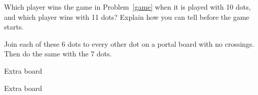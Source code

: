 \documentclass[12pt]{article}
\begin{document}
\vspace{10pt}
\noindent\begin{minipage}[t]{9.6cm}\vspace{0pt}
\answerbox{9.6cm}{9.2cm}
\end{minipage}\hfill
\begin{minipage}[t]{7.6cm}\vspace{0pt}
\end{minipage}

\vspace{6pt}
\problem Which player wins the game in Problem~\ref{game} when it is played with 10 dots, and which player wins with 11 dots? Explain how you can tell before the game starts.

\vspace{10pt}
\noindent\begin{minipage}[t]{7.4cm}\vspace{0pt}
\answerbox{7.4cm}{7.0cm}
\end{minipage}\hfill
\begin{minipage}[t]{9.8cm}\vspace{0pt}
\end{minipage}

\newpage
\problem Join each of these 6 dots to every other dot on a portal board with no crossings. Then do the same with the 7 dots.

\vspace{16pt}
\noindent\begin{minipage}[t]{8.6cm}\centering

\end{minipage}\hfill
\begin{minipage}[t]{8.6cm}\centering

\end{minipage}

\vspace{40pt}
\noindent\begin{minipage}[t]{8.6cm}\centering
\par\vspace{4pt}
{\small Extra board}
\end{minipage}\hfill
\begin{minipage}[t]{8.6cm}\centering
\par\vspace{4pt}
{\small Extra board}
\end{minipage}
\end{document}
